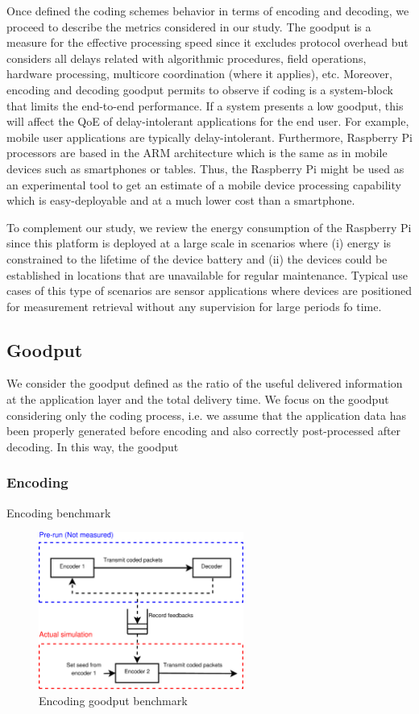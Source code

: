 \label{sec:metrics}

Once defined the coding schemes behavior in terms of encoding
and decoding, we proceed to describe the metrics considered in our study.
The goodput is a measure for the effective processing speed since it
excludes protocol overhead but considers all delays related with
algorithmic procedures, field operations, hardware processing, multicore
coordination (where it applies), etc. Moreover, encoding and decoding
goodput permits to observe if coding is a system-block that limits the
end-to-end performance. If a system presents a low goodput, this will
affect the \ac{QoE} of delay-intolerant applications for the end user.
For example, mobile user applications are typically delay-intolerant.
Furthermore, Raspberry Pi processors are based in the \ac{ARM} architecture
which is the same as in mobile devices such as smartphones or tables.
Thus, the Raspberry Pi might be used as an experimental tool to get an
estimate of a mobile device processing capability which is easy-deployable
and at a much lower cost than a smartphone.

To complement our study, we review the energy consumption of the Raspberry
Pi since this platform is deployed at a large scale in scenarios where (i)
energy is constrained to the lifetime of the device battery and (ii) the
devices could be established in locations that are unavailable for
regular maintenance. Typical use cases of this type of scenarios are
sensor applications where devices are positioned for measurement retrieval
without any supervision for large periods fo time.

\subsection{Goodput}
We consider the goodput defined as the ratio of the useful delivered
information at the application layer and the total delivery time. We focus
on the goodput considering only the coding process, i.e. we assume that
the application data has been properly generated before encoding and
also correctly post-processed after decoding. In this way, the goodput



\subsubsection{Encoding}
Encoding benchmark
\begin{figure}[ht!]
\centering
\includegraphics[width=0.6\textwidth]{images/measure_encoder.pdf}
\caption{Encoding goodput benchmark}
\label{fig:enc_goodput_benchmark}
\end{figure}

